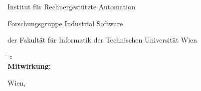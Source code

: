 \begin{otherlanguage}{ngerman}
\begin{center}
\begin{minipage}[t][2.5cm][t]{\textwidth}
  Institut f\"ur Rechnergest\"utzte Automation

  Forschungsgruppe Industrial Software

  der Fakult\"at f\"ur Informatik der Technischen Universit\"at Wien
\end{minipage}
\end{center}

\begin{minipage}[t][4cm][t]{\textwidth}%
  \vspace{0pt}\raggedright\thesistitlefontnormalsize\sffamily
  \begin{tabbing}%
	    \hspace{2.1cm} \= \hspace{6.6cm} \kill
	    \textbf{\tuinfthesisbetreuung:} \> \tuinfthesisbetreins\\
	    \ifAssistance
	    \textbf{Mitwirkung:} \> \tuinfthesisbetrzwei\\
	                \> \tuinfthesisbetrdrei
	    \fi
  \end{tabbing}
\end{minipage}

\begin{minipage}[t][1cm][t]{\textwidth}%
  \vspace{0pt}\sffamily\thesistitlefontnormalsize
  Wien, \tuinfthesisdate
\end{minipage}


\end{otherlanguage}




\restoregeometry

